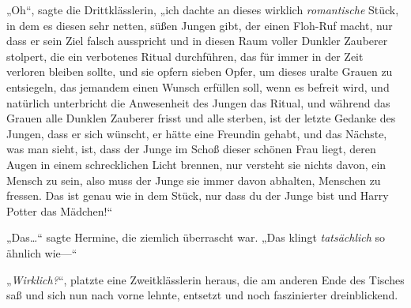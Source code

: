 „Oh“, sagte die Drittklässlerin, „ich dachte an dieses wirklich \emph{romantische} Stück, in dem es diesen sehr netten, süßen Jungen gibt, der einen Floh-Ruf macht, nur dass er sein Ziel falsch ausspricht und in diesen Raum voller Dunkler Zauberer stolpert, die ein verbotenes Ritual durchführen, das für immer in der Zeit verloren bleiben sollte, und sie opfern sieben Opfer, um dieses uralte Grauen zu entsiegeln, das jemandem einen Wunsch erfüllen soll, wenn es befreit wird, und natürlich unterbricht die Anwesenheit des Jungen das Ritual, und während das Grauen alle Dunklen Zauberer frisst und alle sterben, ist der letzte Gedanke des Jungen, dass er sich wünscht, er hätte eine Freundin gehabt, und das Nächste, was man sieht, ist, dass der Junge im Schoß dieser schönen Frau liegt, deren Augen in einem schrecklichen Licht brennen, nur versteht sie nichts davon, ein Mensch zu sein, also muss der Junge sie immer davon abhalten, Menschen zu fressen. Das ist genau wie in dem Stück, nur dass du der Junge bist und Harry Potter das Mädchen!“

„Das…“ sagte Hermine, die ziemlich überrascht war. „Das klingt \emph{tatsächlich} so ähnlich wie—“

„\emph{Wirklich?}“, platzte eine Zweitklässlerin heraus, die am anderen Ende des Tisches saß und sich nun nach vorne lehnte, entsetzt und noch faszinierter dreinblickend.

